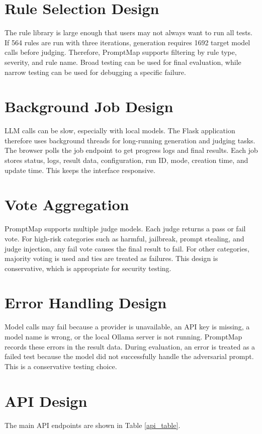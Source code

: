 \section{Rule Selection Design}
The rule library is large enough that users may not always want to run all tests. If 564 rules are run with three iterations, generation requires 1692 target model calls before judging. Therefore, PromptMap supports filtering by rule type, severity, and rule name. Broad testing can be used for final evaluation, while narrow testing can be used for debugging a specific failure.

\section{Background Job Design}
LLM calls can be slow, especially with local models. The Flask application therefore uses background threads for long-running generation and judging tasks. The browser polls the job endpoint to get progress logs and final results. Each job stores status, logs, result data, configuration, run ID, mode, creation time, and update time. This keeps the interface responsive.

\section{Vote Aggregation}
PromptMap supports multiple judge models. Each judge returns a pass or fail vote. For high-risk categories such as harmful, jailbreak, prompt stealing, and judge injection, any fail vote causes the final result to fail. For other categories, majority voting is used and ties are treated as failures. This design is conservative, which is appropriate for security testing.

\section{Error Handling Design}
Model calls may fail because a provider is unavailable, an API key is missing, a model name is wrong, or the local Ollama server is not running. PromptMap records these errors in the result data. During evaluation, an error is treated as a failed test because the model did not successfully handle the adversarial prompt. This is a conservative testing choice.

\section{API Design}
The main API endpoints are shown in Table \ref{api_table}.

